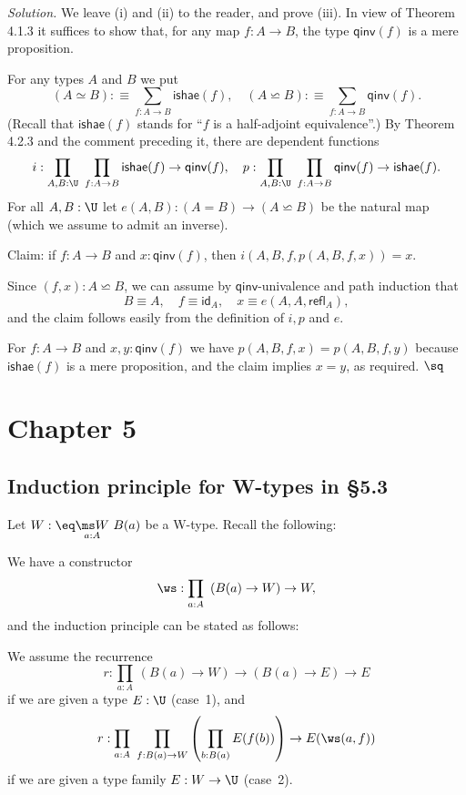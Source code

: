 \documentclass[12pt]{article}
\begin{document}
\nn\emph{Solution.} We leave (i) and (ii) to the reader, and prove (iii). In view of Theorem 4.1.3 it suffices to show that, for any map $f:A\to B$, the type $\mathsf{qinv}(f)$ is a mere proposition. 

For any types $A$ and $B$ we put 
$$
(A\simeq B):\equiv\sum_{f:A\to B}\mathsf{ishae}(f),\quad(A\backsimeq B):\equiv\sum_{f:A\to B}\mathsf{qinv}(f).
$$ 
(Recall that $\mathsf{ishae}(f)$ stands for ``$f$ is a half-adjoint equivalence''.) By Theorem 4.2.3 and the comment preceding it, there are dependent functions 
$$
i:\prod_{A,B:\U}\ \prod_{f:A\to B}\mathsf{ishae}(f)\to\mathsf{qinv}(f),\quad p:\prod_{A,B:\U}\ \prod_{f:A\to B}\mathsf{qinv}(f)\to\mathsf{ishae}(f).
$$ 
For all $A,B:\U$ let $e(A,B):(A=B)\to(A\backsimeq B)$ be the natural map (which we assume to admit an inverse).

Claim: if $f:A\to B$ and $x:\mathsf{qinv}(f)$, then $i(A,B,f,p(A,B,f,x))=x$.
 
Since $(f,x):A\backsimeq B$, we can assume by $\mathsf{qinv}$-univalence and path induction that 
$$
B\equiv A,\quad f\equiv\mathsf{id}_A,\quad x\equiv e(A,A,\mathsf{refl}_A),
$$ 
and the claim follows easily from the definition of $i,p$ and $e$.

For $f:A\to B$ and $x,y:\mathsf{qinv}(f)$ we have $p(A,B,f,x)=p(A,B,f,y)$ because $\mathsf{ishae}(f)$ is a mere proposition, and the claim implies $x=y$, as required. $\sq$


\section{Chapter 5}

\subsection{Induction principle for W-types in \S5.3}%

Let $W:\eq\underset{a:A}{\ms W}\ B(a)$ be a W-type. Recall the following: 

We have a constructor 
$$
\ws:\prod_{a:A}\ \left(B(a)\to W\right)\to W, 
$$ 
and the induction principle can be stated as follows:

We assume the recurrence 
$$
r:\prod_{a:A}\ (B(a)\to W)\to(B(a)\to E)\to E
$$ 
if we are given a type $E:\U$ (case~1), and 
$$
r:\prod_{a:A}\ \prod_{f:B(a)\to W}\left(\prod_{b:B(a)}E(f(b))\right)\to E(\ws(a,f))
$$ 
if we are given a type family $E:W\to\U$ (case~2). 
\end{document}
